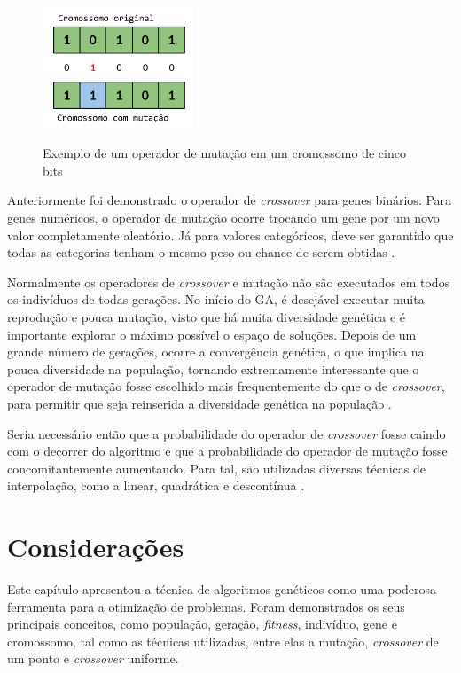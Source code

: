 \documentclass[12pt,oneside,a4paper,english,french,spanish,brazil,]{abntex2}
\begin{document}
\begin{figure}[ht]
\centering
\caption{Exemplo de um operador de mutação em um cromossomo de cinco bits}
\includegraphics[width=0.4\textwidth]{imagens/GA_Mutacao.pdf}
\label{fig:GA_Mutacao}
\end{figure}

Anteriormente foi demonstrado o operador de \textit{crossover} para genes binários. Para genes numéricos, o operador de mutação ocorre trocando um gene por um novo valor completamente aleatório. Já para valores categóricos, deve ser garantido que todas as categorias tenham o mesmo peso ou chance de serem obtidas \cite{linden:2008}.

Normalmente os operadores de \textit{crossover} e mutação não são executados em todos os indivíduos de todas gerações. No início do GA, é desejável executar muita reprodução e pouca mutação, visto que há muita diversidade genética e é importante explorar o máximo possível o espaço de soluções. Depois de um grande número de gerações, ocorre a convergência genética, o que implica na pouca diversidade na população, tornando extremamente interessante que o operador de mutação fosse escolhido mais frequentemente do que o de \textit{crossover}, para permitir que seja reinserida a diversidade genética na população \cite{linden:2008}.

Seria necessário então que a probabilidade do operador de \textit{crossover} fosse caindo com o decorrer do algoritmo e que a probabilidade do operador de mutação fosse concomitantemente aumentando. Para tal, são utilizadas diversas técnicas de interpolação, como a linear, quadrática e descontínua \cite{linden:2008}.

\section{Considerações}

Este capítulo apresentou a técnica de algoritmos genéticos como uma poderosa ferramenta para a otimização de problemas. Foram demonstrados os seus principais conceitos, como população, geração, \textit{fitness}, indivíduo, gene e cromossomo, tal como as técnicas utilizadas, entre elas a mutação, \textit{crossover} de um ponto e \textit{crossover} uniforme.
\end{document}
